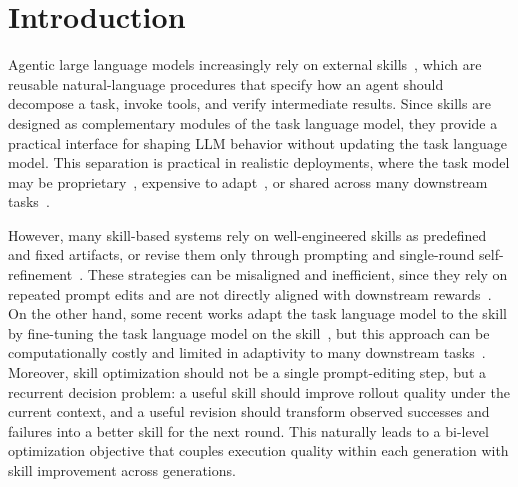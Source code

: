 \section{Introduction}

Agentic large language models increasingly rely on external skills~\citep{xu2026agent,jiang2026sok,chen2026cua,nguyen2025guisurvey,huang2025towardsagentic}, 
which are reusable natural-language procedures that specify how an agent should decompose a task, invoke tools, and verify intermediate results. 
Since skills are designed as complementary modules of the task language model, 
they provide a practical interface for shaping LLM behavior without updating the task language model. 
This separation is practical in realistic deployments, where the task model may be proprietary~\citep{gao2025survey,huang2025surveyfoundation}, 
expensive to adapt~\citep{zhou2025memento,wu2024personalizedmllm,wu2025mitigatingforget,wang2025selfupdatable,zhang2024personalizationsurvey}, or shared across many downstream tasks~\citep{li2026organizing,chen2026skillcraft,jiang2026xskill}.

However, many skill-based systems rely on well-engineered skills as predefined and fixed artifacts, 
or revise them only through prompting and single-round self-refinement~\citep{jiang2026sok,xu2026agent,chen2026cua,jiang2026xskill,chen2026skillcraft,xia2026skillrl,zhang2026memskill}. 
These strategies can be misaligned and inefficient, since they rely on repeated prompt edits and are not directly aligned with downstream rewards~\citep{wu2025incontext,kveton2025activedpo,xia2025surveyactive}.
On the other hand, some recent works adapt the task language model to the skill by fine-tuning the task language model on the skill~\citep{wang2025reinforcement,li2025commit,wang2024instructgraph},
but this approach can be computationally costly and limited in adaptivity to many downstream tasks~\citep{zhou2025memento,xia2026skillrl,jiang2026adaptationagenticaisurvey,wu2025mitigatingforget,yao2024federatedllm}.
Moreover, skill optimization should not be a single prompt-editing step, but a recurrent decision problem: 
a useful skill should improve rollout quality under the current context, 
and a useful revision should transform observed successes and failures into a better skill for the next round. 
This naturally leads to a bi-level optimization objective that couples execution quality within each generation with skill improvement across generations.

